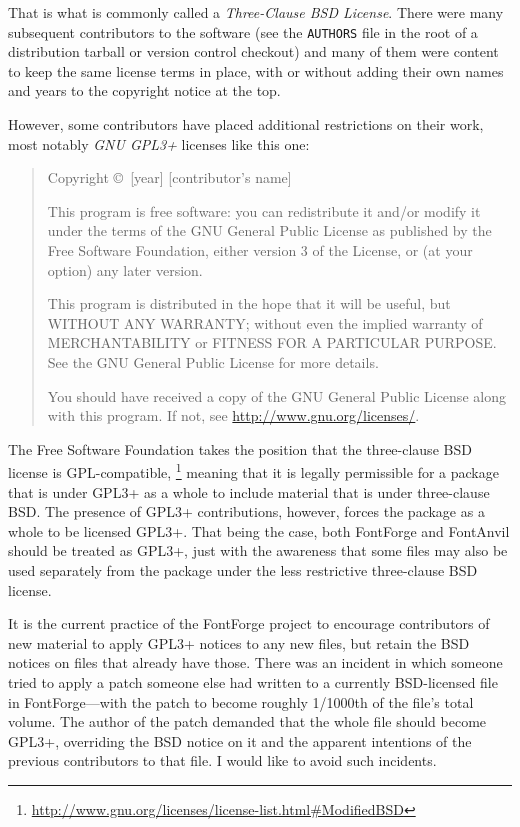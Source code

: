 \documentclass[11pt]{report}
\begin{document}
That is what is commonly called a \emph{Three-Clause BSD License}.  There
were many subsequent contributors to the software (see the \texttt{AUTHORS}
file in the root of a distribution tarball or version control checkout) and
many of them were content to keep the same license terms in place, with or
without adding their own names and years to the copyright notice at the
top.

However, some contributors have placed additional restrictions on their
work, most notably \emph{GNU GPL3+} licenses like this one:

\begin{quotation}
Copyright \copyright\ [year] [contributor's name]

This program is free software: you can redistribute it and/or modify
it under the terms of the GNU General Public License as published by
the Free Software Foundation, either version 3 of the License, or
(at your option) any later version.

This program is distributed in the hope that it will be useful,
but WITHOUT ANY WARRANTY; without even the implied warranty of
MERCHANTABILITY or FITNESS FOR A PARTICULAR PURPOSE.  See the
GNU General Public License for more details.

You should have received a copy of the GNU General Public License
along with this program.  If not, see
\url{http://www.gnu.org/licenses/}.
\end{quotation}

The Free Software Foundation takes the position that the three-clause BSD
license is GPL-compatible,%
\footnote{\url{http://www.gnu.org/licenses/license-list.html\#ModifiedBSD}}
meaning that it is legally permissible for a package that is under GPL3+ as
a whole to include material that is under three-clause BSD.  The presence of
GPL3+ contributions, however, forces the package as a whole to be licensed
GPL3+.  That being the case, both FontForge and FontAnvil should be treated
as GPL3+, just with the awareness that some files may also be used
separately from the package under the less restrictive three-clause BSD
license.

It is the current practice of the FontForge project to encourage
contributors of new material to apply GPL3+ notices to any new files, but
retain the BSD notices on files that already have those.  There was an
incident in which someone tried to apply a patch someone else had written to
a currently BSD-licensed file in FontForge---with the patch to become
roughly 1/1000th of the file's total volume.  The author of the patch
demanded that the whole file should become GPL3+, overriding the BSD notice
on it and the apparent intentions of the previous contributors to that file. 
I would like to avoid such incidents.
\end{document}
